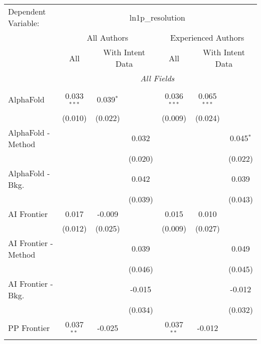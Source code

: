 \begingroup
\centering
\begin{tabular}{lcccccc}
   \tabularnewline \midrule \midrule
   Dependent Variable: & \multicolumn{6}{c}{ln1p\_resolution}\\
 & \multicolumn{3}{c}{All Authors} & \multicolumn{3}{c}{Experienced Authors} \\
\cmidrule(lr){2-4} \cmidrule(lr){5-7}
 & \multicolumn{1}{c}{All} & \multicolumn{2}{c}{With Intent Data} & \multicolumn{1}{c}{All} & \multicolumn{2}{c}{With Intent Data} \\
\cmidrule(lr){2-2} \cmidrule(lr){3-4} \cmidrule(lr){5-5} \cmidrule(lr){6-7}
 & \multicolumn{6}{c}{\textit{All Fields}} \\ \\
   AlphaFold            & 0.033$^{***}$ & 0.039$^{*}$ &         & 0.036$^{***}$ & 0.065$^{***}$ &   \\   
                        & (0.010)       & (0.022)     &         & (0.009)       & (0.024)       &   \\   
   AlphaFold - Method   &               &             & 0.032   &               &               & 0.045$^{*}$\\   
                        &               &             & (0.020) &               &               & (0.022)\\   
   AlphaFold - Bkg.     &               &             & 0.042   &               &               & 0.039\\   
                        &               &             & (0.039) &               &               & (0.043)\\   
   AI Frontier          & 0.017         & -0.009      &         & 0.015         & 0.010         &   \\   
                        & (0.012)       & (0.025)     &         & (0.009)       & (0.027)       &   \\   
   AI Frontier - Method &               &             & 0.039   &               &               & 0.049\\   
                        &               &             & (0.046) &               &               & (0.045)\\   
   AI Frontier - Bkg.   &               &             & -0.015  &               &               & -0.012\\   
                        &               &             & (0.034) &               &               & (0.032)\\   
   PP Frontier          & 0.037$^{**}$  & -0.025      &         & 0.037$^{**}$  & -0.012        &   \\   

\end{tabular}
